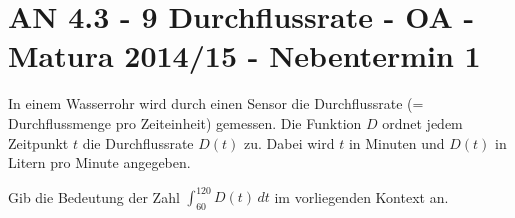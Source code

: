 \section{AN 4.3 - 9 Durchflussrate - OA - Matura 2014/15 - Nebentermin 1}

\begin{beispiel}[AN 4.3]{1} %
In einem Wasserrohr wird durch einen Sensor die Durchflussrate (= Durchflussmenge pro Zeiteinheit) gemessen. Die Funktion $D$ ordnet jedem Zeitpunkt $t$ die Durchflussrate $D(t)$ zu. Dabei wird $t$ in Minuten und $D(t)$ in Litern pro Minute angegeben. \leer

Gib die Bedeutung der Zahl $\int_{60}^{120}{D(t)\,dt}$ im vorliegenden Kontext an.

\end{beispiel}